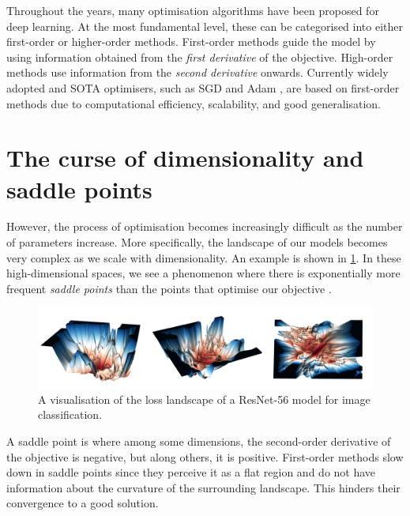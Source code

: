 Throughout the years, many optimisation algorithms have been proposed for deep learning. At the most fundamental level, these can be categorised into either first-order or higher-order methods. First-order methods guide the model by using information obtained from the \textit{first derivative} of the objective. High-order methods use information from the \textit{second derivative} onwards. Currently widely adopted and SOTA optimisers, such as SGD \citep{robbins1951stochastic} and Adam \citep{kingma2014adam}, are based on first-order methods due to computational efficiency, scalability, and good generalisation. 

\section{The curse of dimensionality and saddle points}
\label{sec:curse_of_dimensionality}

However, the process of optimisation becomes increasingly difficult as the number of parameters increase. More specifically, the landscape of our models becomes very complex as we scale with dimensionality. An example is shown in \cref{fig:high_dim_resnet}. In these high-dimensional spaces, we see a phenomenon where there is exponentially more frequent \textit{saddle points} than the points that optimise our objective \citep{dauphin2014sfn}. 

\begin{figure}[h]
  \centering
    \includegraphics[width=\textwidth]{figures/0intro/intro_landscape.png}
    \caption{A visualisation of the loss landscape of a ResNet-56 model for image classification.}
    \label{fig:high_dim_resnet}
\end{figure}

A saddle point is where among some dimensions, the second-order derivative of the objective is negative, but along others, it is positive. First-order methods slow down in saddle points since they perceive it as a flat region and do not have information about the curvature of the surrounding landscape. This hinders their convergence to a good solution. 

